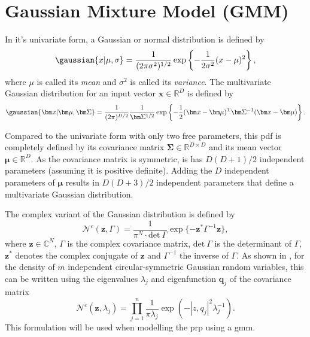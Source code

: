 \section{Gaussian Mixture Model (GMM)}
\label{sec:gmm}
In it's univariate form, a Gaussian or normal distribution is defined by
\begin{equation}
	\gaussian{x\vert\mu,\sigma}=\frac{1}{(2\pi\sigma^2)^{1/2}}\exp\left\{-\frac{1}{2\sigma^2}(x-\mu)^2\right\},
\end{equation}
where $\mu$ is called its \textit{mean} and $\sigma^2$ is called its \textit{variance}.
The multivariate Gaussian distribution for an input vector $\bm x\in\mathbb{R}^D$ is defined by
\begin{equation}
	\gaussian{\bm x\vert\bm\mu,\bm\Sigma}=\frac{1}{(2\pi)^{D/2}}\frac{1}{\bm\Sigma^{1/2}}\exp\left\{-\frac{1}{2}(\bm x-\bm\mu)^{\text{T}} \bm\Sigma^{-1}(\bm x-\bm\mu)\right\}.
\end{equation}



Compared to the univariate form with only two free parameters, this \gls{pdf} is completely defined by its covariance matrix $\bm\Sigma\in\mathbb{R}^{D\times D}$ and its mean vector $\bm\mu\in\mathbb{R}^D$. As the covariance matrix is symmetric, is has $D(D+1)/2$ independent parameters (assuming it is positive definite). Adding the $D$ independent parameters of $\bm\mu$ results in $D(D+3)/2$ independent parameters that define a multivariate Gaussian distribution. 

The complex variant of the Gaussian distribution is defined by
\begin{equation}
    \mathcal{N}^c(\bm z,\Gamma)=\frac{1}{\pi^N\cdot\text{det}\ \Gamma}\exp\{ -\bm z^*\Gamma^{-1}\bm z \},
\end{equation}
where $\bm z\in\mathbb{C}^N$, $\Gamma$ is the complex covariance matrix, $\text{det}\ \Gamma$ is the determinant of $\Gamma$, $\bm z^*$ denotes the complex conjugate of $\bm z$ and $\Gamma^{-1}$ the inverse of $\Gamma$. As shown in \cite{Gallager2008}, for the density of $m$ independent circular-symmetric Gaussian random variables, this can be written using the eigenvalues $\lambda_j$ and eigenfunction $\bm q_j$ of the covariance matrix
\begin{equation}
\label{eg:complexGaussianDef}
    \mathcal{N}^c(\bm z,\lambda_j)=\prod_{j=1}^n\frac{1}{\pi\lambda_j}\exp(-|z,q_j|^2\lambda_j^{-1}).
\end{equation}
This formulation will be used when modelling the \gls{prp} using a \gls{gmm}.\\

